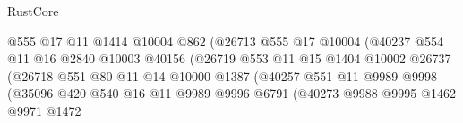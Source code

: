 \begin{lexlean}{RustCore}
\begin{coremodule}
                                        @555
                                        @17
                                        @11
                                        @1414
                                        @10004
                                        @862
                                        (@26713
                                          @555
                                          @17
                                          @10004
                                          (@40237
                                            @554
                                            @11
                                            @16
                                            @2840
                                            @10003
                                            @40156
                                            (@26719
                                              @553
                                              @11
                                              @15
                                              @1404
                                              @10002
                                              @26737
                                              (@26718
                                                @551
                                                @80
                                                @11
                                                @14
                                                @10000
                                                @1387
                                                (@40257
                                                  @551
                                                  @11
                                                  @9989
                                                  @9998
                                                  (@35096
                                                    @420
                                                    @540
                                                    @16
                                                    @11
                                                    @9989
                                                    @9996
                                                    @6791
                                                    (@40273
                                                      @9988
                                                      @9995
                                                      @1462
                                                      @9971
                                                      @1472

\end{coremodule}
\end{lexlean}
